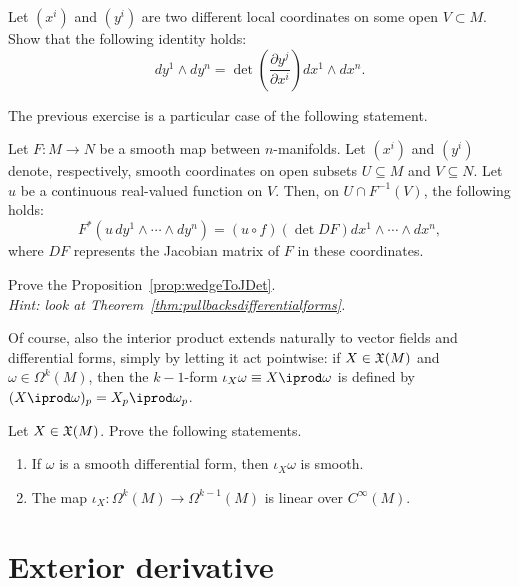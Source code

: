 \begin{exercise}
  Let $(x^i)$ and $(y^i)$ are two different local coordinates on some open $V\subset M$.
  Show that the following identity holds:
  \begin{equation}
    dy^1\wedge dy^n = \det\left(\frac{\partial y^j}{\partial x^i}\right) dx^1\wedge dx^n.
  \end{equation}
\end{exercise}

The previous exercise is a particular case of the following statement.

\begin{proposition}\label{prop:wedgeToJDet}
  Let $F:M\to N$ be a smooth map between $n$-manifolds.
  Let $(x^i)$ and $(y^i)$ denote, respectively, smooth coordinates on open subsets $U\subseteq M$ and $V\subseteq N$.
  Let $u$ be a continuous real-valued function on $V$.
  Then, on $U\cap F^{-1}(V)$, the following holds:
  \begin{equation}
    F^*(u\, dy^1\wedge\cdots\wedge dy^n)
    = (u\circ f) (\det DF) dx^1\wedge\cdots\wedge dx^n,
  \end{equation}
  where $DF$ represents the Jacobian matrix of $F$ in these coordinates.
\end{proposition}

\begin{exercise}
  Prove the Proposition~\ref{prop:wedgeToJDet}.\\
  \textit{\small Hint: look at Theorem~\ref{thm:pullbacksdifferentialforms}.}
\end{exercise}

Of course, also the interior product extends naturally to vector fields and differential forms, simply by letting it act pointwise: if $X\in\mathfrak{X}(M)$ and $\omega\in\Omega^k(M)$, then the $k-1$-form $\iota_X\omega\equiv X\iprod\omega$ is defined by $(X\iprod\omega)_p = X_p \iprod \omega_p$.

\begin{exercise}
  Let $X\in\mathfrak{X}(M)$. Prove the following statements.
  \begin{enumerate}
    \item If $\omega$ is a smooth differential form, then $\iota_X\omega$ is smooth.
    \item The map $\iota_X:\Omega^k(M)\to\Omega^{k-1}(M)$ is linear over $C^\infty(M)$.
  \end{enumerate}
\end{exercise}

\section{Exterior derivative}

